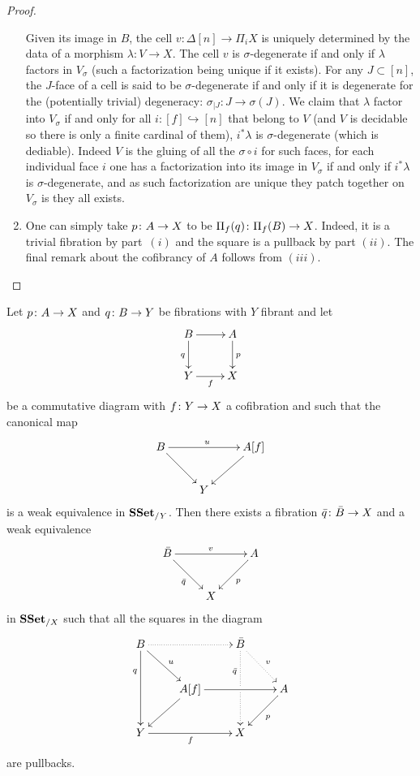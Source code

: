 \documentclass[reqno,10pt,a4paper,oneside,draft]{amsart}
\begin{document}
\begin{proof}
\begin{enumerate}[$(i)$]
Given its image in $B$, the cell $v: \Delta[n] \rightarrow \Pi_i X$ is uniquely determined by the data of a morphism $\lambda: V\rightarrow X$. The cell $v$ is $\sigma$-degenerate if and only if $\lambda$ factors in $V_{\sigma}$ (such a factorization being unique if it exists). For any $J \subset [n]$, the $J$-face of a cell is said to be $\sigma$-degenerate if and only if it is degenerate for the (potentially trivial) degeneracy: $\sigma_{|J} : J \rightarrow \sigma(J)$. We claim that $\lambda$ factor into $V_{\sigma}$ if and only for all $i:[f] \hookrightarrow [n]$ that belong to $V$ (and $V$ is decidable so there is only a finite cardinal of them), $i^* \lambda$ is $\sigma$-degenerate (which is dediable). Indeed $V$ is the gluing of all the $\sigma \circ i$ for such faces, for each individual face $i$ one has a factorization into its image in $V_{\sigma}$ if and only if $i^* \lambda$ is $\sigma$-degenerate, and as such factorization are unique they patch together on $V_{\sigma}$ is they all exists.

\item One can simply take $p \colon A \to X$ to be $\Pi_f(q) \colon \Pi_f(B) \to X$. Indeed, it is a trivial fibration by part~$(i)$ and the square is a pullback by part $(ii)$. The final remark about the cofibrancy of 
$A$ follows from $(iii)$. \qedhere
\end{enumerate}
\end{proof}





\begin{proposition}
\label{Prop:Homotopy_ext_prop}
Let $p \colon A \to X$ and $q \colon B \to Y$ be fibrations with $Y$ fibrant and let
\[
\xymatrix{
B \ar[r] \ar[d]_q & A \ar[d]^p \\
Y \ar[r]_f & X}
\]
be a commutative diagram with $f \colon Y \to X$ a cofibration and such that the canonical map
\begin{equation}
\label{equ:gluedata}
\begin{gathered}
\xymatrix{
B \ar[rr]^{u} \ar[dr] &  & A[f] \ar[dl] \\
 & Y &}
 \end{gathered}
 \end{equation}
is a weak equivalence in $\mathbf{SSet}_{/ Y}$. Then there exists a fibration $\bar{q} \colon \bar{B} \to X$ and a weak equivalence
\[
\xymatrix{
\bar{B} \ar[rr]^{v} \ar[dr]_{\bar{q}} &  & A \ar[dl]^{p} \\
 & X &}
 \]
 in $\mathbf{SSet}_{/X}$ such that all the squares in the diagram
\[ 
\xymatrix{
 B
  \ar@{.>}[rr]
  \ar[dr]^{u}
  \ar[dd]_(.3){q}
&&
  \bar{B}
  \ar@{.>}[dr]^{v}
  \ar@{.>}[dd]_(.3){\bar{q}}|{\hole}
&\\&
  A[f] 
  \ar[rr]
  \ar[dl]
&&
  A
  \ar[dl]^{p}
\\
  Y
  \ar[rr]_{f}
&&
  X
&
}
\]
are pullbacks. 
\end{proposition}
\end{document}
